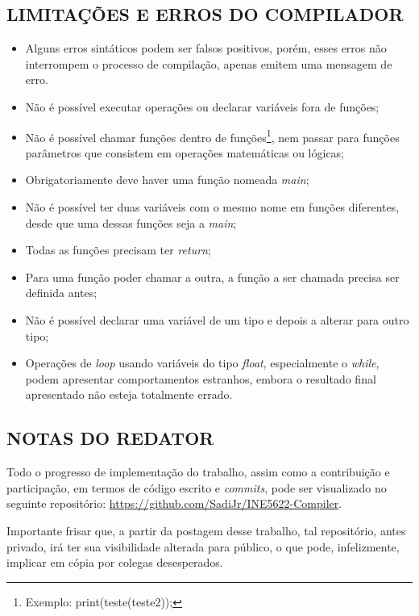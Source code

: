 	\subsection{\normalsize LIMITAÇÕES E ERROS DO COMPILADOR}
	\begin{itemize}
		\item Alguns erros sintáticos podem ser falsos positivos, porém, esses erros não interrompem o processo de compilação, apenas emitem uma mensagem de erro.
		\item Não é possível executar operações ou declarar variáveis fora de funções;
		\item Não é possível chamar funções dentro de funções\footnote{Exemplo: print(teste(teste2));}, nem passar para funções parâmetros que consistem em operações matemáticas ou lógicas;
		\item Obrigatoriamente deve haver uma função nomeada \textit{main};
		\item Não é possível ter duas variáveis com o mesmo nome em funções diferentes, desde que uma dessas funções seja a \textit{main};
		\item Todas as funções precisam ter \textit{return};
		\item Para uma função poder chamar a outra, a função a ser chamada precisa ser definida antes;
		\item Não é possível declarar uma variável de um tipo e depois a alterar para outro tipo;
		\item Operações de \textit{loop} usando variáveis do tipo \textit{float}, especialmente o \textit{while}, podem apresentar comportamentos estranhos, embora o resultado final apresentado não esteja totalmente errado.
	\end{itemize}
	
	\subsection{\normalsize NOTAS DO REDATOR}
	Todo o progresso de implementação do trabalho, assim como a contribuição e participação, em termos de código escrito e \textit{commits}, pode ser visualizado no seguinte repositório: \url{https://github.com/SadiJr/INE5622-Compiler}.

	Importante frisar que, a partir da postagem desse trabalho, tal repositório, antes privado, irá ter sua visibilidade alterada para público, o que pode, infelizmente, implicar em cópia por colegas desesperados.